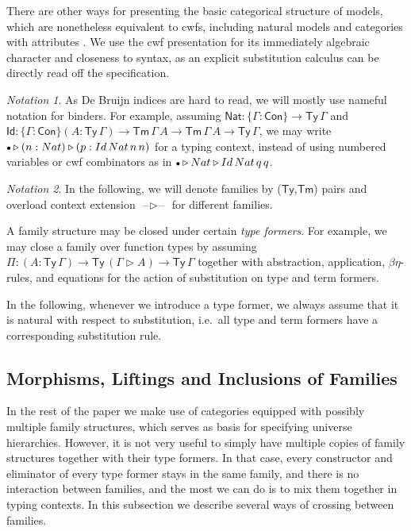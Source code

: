 \documentclass[a4paper,UKenglish,cleveref, autoref, thm-restate]{lipics-v2021}
\theoremstyle{remark}
\newtheorem{notation}{Notation}
\theoremstyle{definition}
\newcommand{\Con}{\mathsf{Con}}
\newcommand{\Ty}{\mathsf{Ty}}
\newcommand{\Tm}{\mathsf{Tm}}
\newcommand{\emptycon}{\scaleobj{.75}\bullet}
\newcommand{\ext}{\triangleright}
\newcommand{\blank}{\mathord{\hspace{1pt}\text{--}\hspace{1pt}}}
\newcommand{\q}{\mathsf{q}}
\newcommand{\Id}{\mathsf{Id}}
\newcommand{\Nat}{\mathsf{Nat}}
\begin{document}
There are other ways for presenting the basic categorical structure of models,
which are nonetheless equivalent to cwfs, including natural models \cite{awodey18natural}
and categories with attributes \cite{cartmellthesis}. We use the cwf presentation for its
immediately algebraic character and closeness to syntax, as an explicit
substitution calculus can be directly read off the specification.

\begin{notation}As De Bruijn indices are hard to read, we will mostly use
nameful notation for binders. For example, assuming $\Nat : \{\Gamma : \Con\}
\to \Ty\,\Gamma$ and $\Id : \{\Gamma : \Con\}(A : \Ty\,\Gamma) \to
\Tm\,\Gamma\,A \to \Tm\,\Gamma\,A \to \Ty\,\Gamma$, we may write $\emptycon \ext
(n : \Nat) \ext (p : \Id\,\Nat\,n\,n)$ for a typing context, instead of using
numbered variables or cwf combinators as in $\emptycon \ext \Nat \ext
\Id\,\Nat\,\q\,\q$.
\end{notation}

\begin{notation}
In the following, we will denote families by ($\Ty$,$\Tm$) pairs and overload context
extension $\blank\ext\blank$ for different families.
\end{notation}

A family structure may be closed under certain \emph{type formers}. For example,
we may close a family over function types by assuming $\Pi : (A : \Ty\,\Gamma)
\to \Ty\,(\Gamma\ext A) \to \Ty\,\Gamma$ together with abstraction, application,
$\beta\eta$-rules, and equations for the action of substitution on type and term
formers.

In the following, whenever we introduce a type former, we always assume that it
is natural with respect to substitution, i.e.\ all type and term formers have a
corresponding substitution rule.

\subsection{Morphisms, Liftings and Inclusions of Families}
\label{sec:morphisms}

In the rest of the paper we make use of categories equipped with possibly
multiple family structures, which serves as basis for specifying universe
hierarchies. However, it is not very useful to simply have multiple copies of
family structures together with their type formers. In that case, every
constructor and eliminator of every type former stays in the same family, and
there is no interaction between families, and the most we can do is to mix them
together in typing contexts. In this subsection we describe several ways of
crossing between families.
\end{document}
